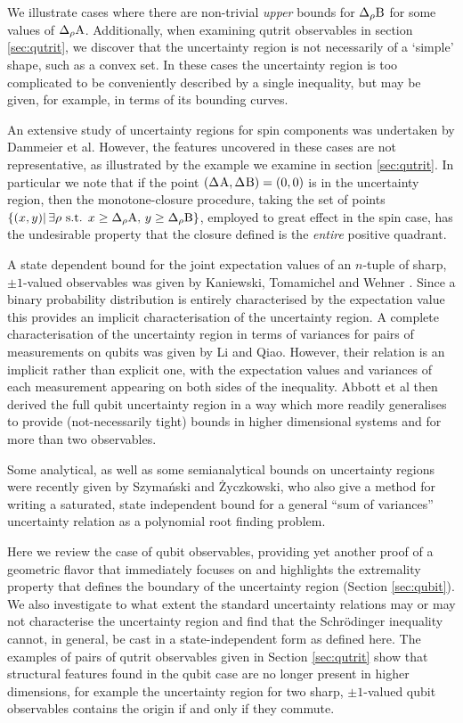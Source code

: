 We illustrate cases where there are non-trivial \emph{upper} bounds for $\sdevr{\opb}$ for some values of $\sdevr{\opa}$. Additionally, when examining qutrit observables in section \ref{sec:qutrit}, we discover that the uncertainty region is not necessarily of a `simple' shape, such as a convex set. In these cases the uncertainty region is too complicated to be conveniently described by a single inequality, but may be given, for example, in terms of its bounding curves.

An extensive study of uncertainty regions for spin components was undertaken by  Dammeier et al.\cite{werner-ang-mom}
However, the features uncovered in these cases are not representative, as illustrated by the example we examine in section \ref{sec:qutrit}. In particular we note that if the point $(\sdev{\opa},\sdev{\opb} ) = (0,0)$ is in the uncertainty region, then the monotone-closure procedure, taking the set of points $\{(x,y) |\, \exists \rho \text{ s.t. } x\geq \sdevr{\opa},\, y\geq\sdevr{\opb}\}$, employed to great effect in the spin case, has the undesirable property that the closure defined is the \emph{entire} positive quadrant.

A state dependent bound for the joint expectation values of an $n$-tuple of sharp, $\pm 1$-valued observables was given by Kaniewski, Tomamichel and Wehner \cite{PhysRevA.90.012332}. Since a binary probability distribution is entirely characterised by the expectation value this provides an implicit characterisation of the uncertainty region. A complete characterisation of the uncertainty region in terms of variances for pairs of measurements on qubits was given by Li and Qiao\cite{li-refomulating-uncertainty-principle}. However, their relation is an implicit rather than explicit one, with the expectation values and variances of each measurement appearing on both sides of the inequality. Abbott et al\cite{abbott-state-indep-qubits}  then derived the full qubit uncertainty region in a way which more readily generalises to provide (not-necessarily tight) bounds in higher dimensional systems and for more than two observables.

Some analytical, as well as some semianalytical bounds on uncertainty regions were recently given by Szymański and \.{Z}yczkowski\cite{1804.06191}, who also give a method for writing a saturated, state independent bound for a general ``sum of variances'' uncertainty relation as a polynomial root finding problem.

Here we review the case of qubit observables, providing yet another proof of a geometric flavor that immediately focuses on and highlights the extremality property that defines the boundary of the uncertainty region (Section \ref{sec:qubit}). We also investigate to what extent the standard uncertainty relations may or may not characterise the uncertainty region and find that the Schr\"odinger inequality cannot, in general, be cast in a state-independent form as defined here. The examples of pairs of qutrit observables given in Section \ref{sec:qutrit} show that structural features found in the qubit case are no longer present in higher dimensions, for example the uncertainty region for two sharp, $\pm 1$-valued qubit observables contains the origin if and only if they commute.

